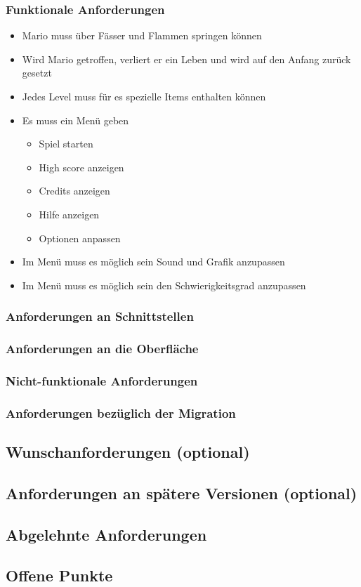 \documentclass[12pt]{article}
\begin{document}
\subsubsection{Funktionale Anforderungen}

\begin{itemize}
\item Mario muss über Fässer und Flammen springen können
\item Wird Mario getroffen, verliert er ein Leben und wird auf den Anfang zurück gesetzt
\item Jedes Level muss für es spezielle Items enthalten können

\item Es muss ein Menü geben
\begin{itemize}
\item Spiel starten
\item High score anzeigen
\item Credits anzeigen
\item Hilfe anzeigen
\item Optionen anpassen
\end{itemize}

\item Im Menü muss es möglich sein Sound und Grafik anzupassen
\item Im Menü muss es möglich sein den Schwierigkeitsgrad anzupassen

\end{itemize}

\subsubsection{Anforderungen an Schnittstellen}
\subsubsection{Anforderungen an die Oberfläche}
\subsubsection{Nicht-funktionale Anforderungen}
\subsubsection{Anforderungen bezüglich der Migration}

\subsection{Wunschanforderungen (optional)}

\subsection{Anforderungen an spätere Versionen (optional)}

\subsection{Abgelehnte Anforderungen}

\subsection{Offene Punkte}
\end{document}
